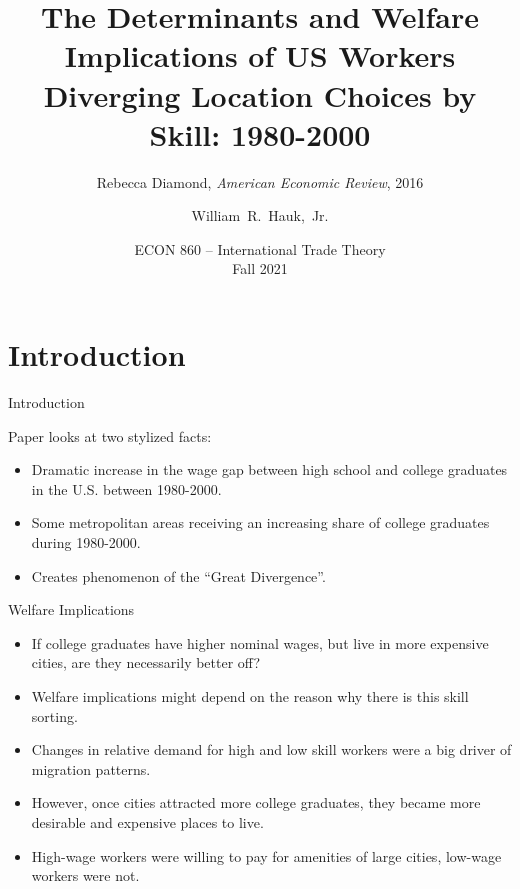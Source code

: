 \documentclass[aspectratio=169]{beamer}
\title[Diamond (2016)] %
{The Determinants and Welfare Implications of US Workers Diverging Location Choices by Skill: 1980-2000}
\subtitle{Rebecca Diamond, \emph{American Economic Review}, 2016}
\author [Hauk] %
{William~R.~Hauk,~Jr.} %
\institute[UofSC] %
{
  Darla Moore School of Business\\
  University of South Carolina
}
\date[ECON 860, Fall 2021] %
{ECON 860 -- International Trade Theory\\Fall 2021}
\begin{document}
\frame{\titlepage}


\section{Introduction}


\begin{frame}{Introduction}

Paper looks at two stylized facts:
\begin{itemize}
    \item<1-> Dramatic increase in the wage gap between high school and college graduates in the U.S. between 1980-2000.
    \item<2-> Some metropolitan areas receiving an increasing share of college graduates during 1980-2000.
    \item<3-> Creates phenomenon of the ``Great Divergence”.
\end{itemize}
    
\end{frame}


\begin{frame}{Welfare Implications}

\begin{itemize}
    \item<1-> If college graduates have higher nominal wages, but live in more expensive cities, are they necessarily better off?
    \item<2-> Welfare implications might depend on the reason why there is this skill sorting.
    \item<3-> Changes in relative demand for high and low skill workers were a big driver of migration patterns.
    \item<4-> However, once cities attracted more college graduates, they became more desirable and expensive places to live.
    \item<5-> High-wage workers were willing to pay for amenities of large cities, low-wage workers were not.
\end{itemize}
    
\end{frame}

\end{document}
